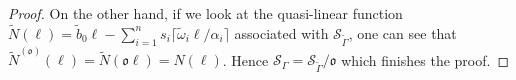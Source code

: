 \documentclass[10pt,a4paper]{amsart}
\newcommand{\G}{\Gamma}
\newcommand{\Se}{\mathcal{S}}
\newcommand{\al}{\alpha}
\newcommand{\calS}{{\mathcal S}}\newcommand{\cals}{{\bf s}}\newcommand{\calst}{{\bf st}}\newcommand{\cS}{{\mathcal S}}
\newcommand{\oo}{\mathfrak{o}}
\newcommand{\w}{\omega}
\begin{document}
\begin{proof}
    On the other hand, if we look at the quasi-linear function  $\tilde{N}(\ell)=\tilde{b}_0 \ell -\sum_{i=1}^n s_i\lceil\tilde{\w}_i \ell/\al_i\rceil$ associated with $\calS_{\tilde{\Gamma}}$, one can see that 
    $ \tilde{N}^{(\oo)}(\ell)=\tilde{N}(\oo\ell)=N(\ell)$. Hence $\Se_{\G}=\Se_{\tilde{\G}}/\oo$ which finishes the proof. 
  

    
     
%      
%   
% 
 \end{proof}
\end{document}
